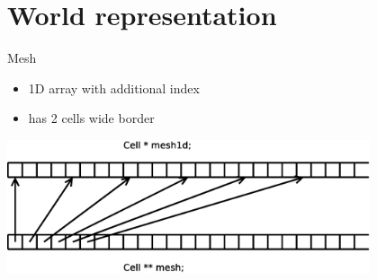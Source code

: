 \documentclass{beamer}
\begin{document}
\section{World representation}

\begin{frame}{Mesh}
    \begin{itemize}
        \item 1D array with additional index
        \item has 2 cells wide border
    \end{itemize}

    \begin{center}
        \includegraphics[width=0.8\textwidth]{mesh}
    \end{center}
\end{frame}
\end{document}
